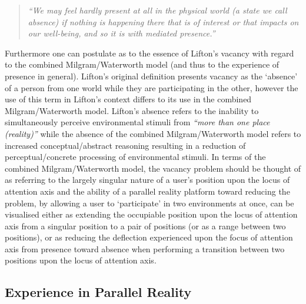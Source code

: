 \begin{quote}
	\textit{``We may feel hardly present at all in the physical world (a state we call absence) if nothing is happening there that is of interest or that impacts on our well-being, and so it is with mediated presence.''}~\cite{Waterworth2014}
\end{quote}

Furthermore one can postulate as to the essence of Lifton's vacancy with regard to the combined Milgram/Waterworth model (and thus to the experience of presence in general). Lifton's original definition presents vacancy as the `absence' of a person from one world while they are participating in the other, however the use of this term in Lifton's context differs to its use in the combined Milgram/Waterworth model. Lifton's absence refers to the inability to simultaneously perceive environmental stimuli from \textit{``more than one place (reality)''} while the absence of the combined Milgram/Waterworth model refers to increased conceptual/abstract reasoning resulting in a reduction of perceptual/concrete processing of environmental stimuli. In terms of the combined Milgram/Waterworth model, the vacancy problem should be thought of as referring to the largely singular nature of a user's position upon the locus of attention axis and the ability of a parallel reality platform toward reducing the problem, by allowing a user to `participate' in two environments at once, can be visualised either as extending the occupiable position upon the locus of attention axis from a singular position to a pair of positions (or as a range between two positions), or as reducing the deflection experienced upon the focus of attention axis from presence toward absence when performing a transition between two positions upon the locus of attention axis.




\subsection{Experience in Parallel Reality}

\label{transitions_in_parallel_reality}

